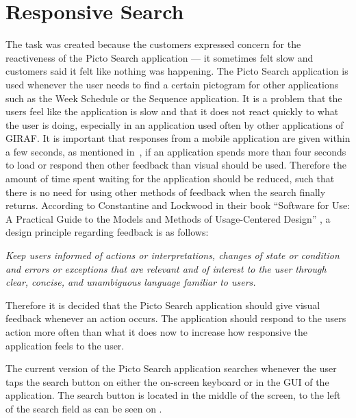 \section{Responsive Search}\label{RSearch}
\begin{center}
\end{center}

The task was created because the customers expressed concern for the reactiveness of the Picto Search application --- it sometimes felt slow and customers said it felt like nothing was happening.
The Picto Search application is used whenever the user needs to find a certain pictogram for other applications such as the Week Schedule or the Sequence application.
It is a problem that the users feel like the application is slow and that it does not react quickly to what the user is doing, especially in an application used often by other applications of GIRAF.
It is important that responses from a mobile application are given within a few seconds, as mentioned in~\cite{Roto:2005:NNF:1062745.1062747}, if an application spends more than four seconds to load or respond then other feedback than visual should be used.
Therefore the amount of time spent waiting for the application should be reduced, such that there is no need for using other methods of feedback when the search finally returns.
According to Constantine and Lockwood in their book \enquote{Software for Use: A Practical Guide to the Models and Methods of Usage-Centered Design} \cite{DESIGNBOOK}, a design principle regarding feedback is as follows:

\begin{displayquote}
\textit{Keep users informed of actions or interpretations, changes of state or condition and errors or exceptions that are relevant and of interest to the user through clear, concise, and unambiguous language familiar to users\cite[p.~57]{DESIGNBOOK}.}
\end{displayquote}

Therefore it is decided that the Picto Search application should give visual feedback whenever an action occurs.
The application should respond to the users action more often than what it does now to increase how responsive the application feels to the user.

The current version of the Picto Search application searches whenever the user taps the search button on either the on-screen keyboard or in the GUI of the application.
The search button is located in the middle of the screen, to the left of the search field as can be seen on .

